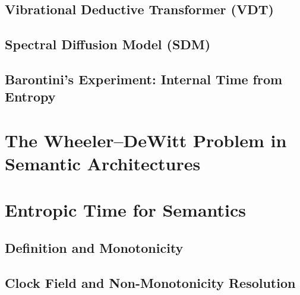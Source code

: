 \documentclass[11pt]{article}
\begin{document}
  \subsection{Vibrational Deductive Transformer (VDT)}
  \label{sec:vdt}

  \subsection{Spectral Diffusion Model (SDM)}
  \label{sec:sdm}

  \subsection{Barontini's Experiment: Internal Time from Entropy}
  \label{sec:barontini}

\section{The Wheeler--DeWitt Problem in Semantic Architectures}
\label{sec:wdw}

\section{Entropic Time for Semantics}
\label{sec:entropic_time}

  \subsection{Definition and Monotonicity}
  \label{sec:tau_definition}

  \subsection{Clock Field and Non-Monotonicity Resolution}
  \label{sec:clock_field}
\end{document}
